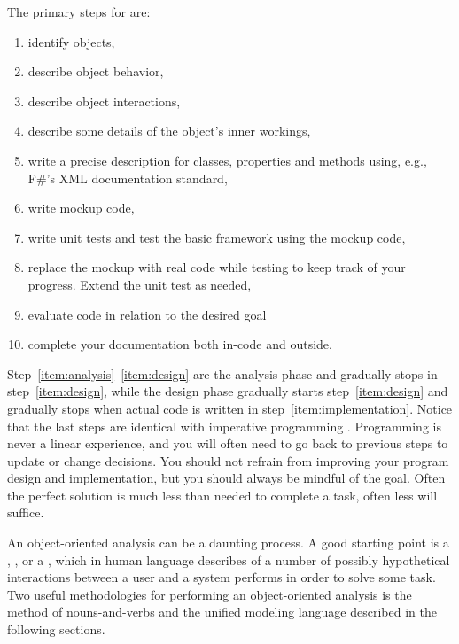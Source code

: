 The primary steps for  are:
\begin{enumerate}
\item identify objects,\label{item:analysis}\label{item:identifyObjects}
\item describe object behavior, \label{item:objectBehaviour}
\item describe object interactions, \label{item:objectInteraction}
\item describe some details of the object's inner workings,\label{item:design}\label{item:objectDetails}
\item write a precise description for classes, properties and methods using, e.g., F\#'s XML documentation standard,
\item write mockup code,  \label{item:objectMockup}
\item write unit tests and test the basic framework using the mockup code,\label{item:implementation}
\item replace the mockup with real code while testing to keep track of
  your progress. Extend the unit test as needed,
\item evaluate code in relation to the desired goal
\item complete your documentation both in-code and outside.
\end{enumerate}
Step~\ref{item:analysis}--\ref{item:design} are the analysis phase and gradually stops in step~\ref{item:design}, while the design phase gradually starts step~\ref{item:design} and gradually stops when actual code is written in step~\ref{item:implementation}. Notice that the last steps are identical with imperative programming . Programming is never a linear experience, and you will often need to go back to previous steps to update or change decisions. You should not refrain from improving your program design and implementation, but you should always be mindful of the goal. Often the perfect solution is much less than needed to complete a task, often less will suffice.

An object-oriented analysis can be a daunting process. A good starting point is a , , or a , which in human language describes of a number of possibly hypothetical interactions between a user and a system performs in order to solve some task. Two useful methodologies for performing an object-oriented analysis is the method of nouns-and-verbs and the unified modeling language described in the following sections.

